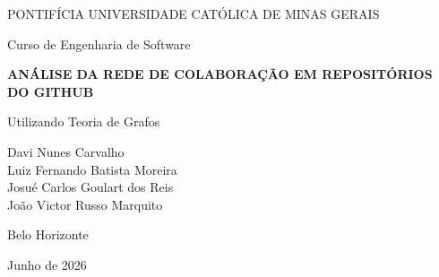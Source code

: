 \documentclass[12pt,a4paper]{article}
\begin{document}
\begin{titlepage}
\centering

\vspace*{2cm}

{\large PONTIFÍCIA UNIVERSIDADE CATÓLICA DE MINAS GERAIS\par}
{\large Curso de Engenharia de Software\par}

\vfill

{\Large\bfseries ANÁLISE DA REDE DE COLABORAÇÃO EM REPOSITÓRIOS DO GITHUB\par}

\vspace{0.5cm}

{\large Utilizando Teoria de Grafos\par}

\vfill

{\large
Davi Nunes Carvalho\\
Luiz Fernando Batista Moreira\\
Josué Carlos Goulart dos Reis\\
João Victor Russo Marquito
\par}

\vfill

{\large Belo Horizonte\par}
{\large Junho de 2026\par}

\end{titlepage}


\begin{abstract}
Este trabalho apresenta uma ferramenta para análise de redes de colaboração em repositórios do GitHub utilizando Teoria de Grafos. O sistema modela interações entre colaboradores (comentários, revisões, merges e fechamentos de issues) como grafos ponderados direcionados. A implementação inclui duas representações de grafos (lista de adjacência e matriz de adjacência), integração com a API REST do GitHub, cálculo de 10+ métricas de análise de rede (PageRank, betweenness, closeness, eigenvector, clustering, assortatividade, detecção de comunidades e bridging ties) e exportação CSV compatível com o Gephi. O projeto foi validado com 84 testes unitários e executado sobre o repositório \texttt{devlikeapro/waha}.
\end{abstract}
\end{document}
